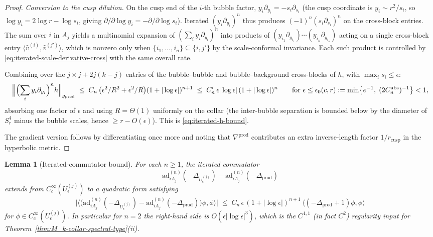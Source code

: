 \documentclass[11pt,letterpaper]{article}
\newtheorem{lemma}[theorem]{Lemma}
\theoremstyle{definition}
\newcommand{\Lap}{\Delta}
\begin{document}
\begin{proof}
\emph{Conversion to the cusp dilation.} On the cusp end of the $i$-th bubble factor, $y_i\partial_{y_i} = -s_i\partial_{s_i}$ (the cusp coordinate is $y_i \sim r^2/s_i$, so $\log y_i = 2\log r - \log s_i$, giving $\partial/\partial\log y_i = -\partial/\partial\log s_i$). Iterated $(y_i\partial_{y_i})^n$ thus produces $(-1)^n (s_i\partial_{s_i})^n$ on the cross-block entries. The sum over $i$ in $A_j$ yields a multinomial expansion of $(\sum_i y_i\partial_{y_i})^n$ into products of $(y_{i_1}\partial_{y_{i_1}})\cdots(y_{i_n}\partial_{y_{i_n}})$ acting on a single cross-block entry $\langle\hat v^{(i)}, \hat v^{(j')}\rangle$, which is nonzero only when $\{i_1,\dots,i_n\}\subseteq\{i,j'\}$ by the scale-conformal invariance. Each such product is controlled by \eqref{eq:iterated-scale-derivative-cross} with the same overall rate.

Combining over the $j\times j + 2j(k-j)$ entries of the bubble--bubble and bubble--background cross-blocks of $h$, with $\max_i s_i \le \epsilon$:
\[
\Bigl\|\Bigl(\sum_i y_i\partial_{y_i}\Bigr)^n h\Bigr\|_{g_{\mathrm{prod}}} \;\le\; C_n\,\bigl(\epsilon^2/R^2 + \epsilon^2/R\bigr)(1+|\log\epsilon|)^{n+1} \;\le\; C'_n\,\epsilon|\log\epsilon|\,(1+|\log\epsilon|)^n
\qquad \text{for } \epsilon \le \epsilon_0(c, r) := \min\bigl\{e^{-1},\; (2 C_n^{\mathrm{abs}})^{-1}\bigr\} < 1,
\]
absorbing one factor of $\epsilon$ and using $R = \Theta(1)$ uniformly on the collar (the inter-bubble separation is bounded below by the diameter of $S^4_r$ minus the bubble scales, hence $\ge r - O(\epsilon)$). This is \eqref{eq:iterated-h-bound}.

The gradient version follows by differentiating once more and noting that $\nabla^{\mathrm{prod}}$ contributes an extra inverse-length factor $1/r_{\mathrm{cusp}}$ in the hyperbolic metric.
\end{proof}

\begin{lemma}[Iterated-commutator bound]\label{app:lem:iterated}
For each $n \ge 1$, the iterated commutator
\[
\mathrm{ad}_{iA_j}^{(n)}(-\Lap_{U_\epsilon^{(j)}}) - \mathrm{ad}_{iA_j}^{(n)}(-\Lap_{\mathrm{prod}})
\]
extends from $C_c^\infty(U_\epsilon^{(j)})$ to a quadratic form satisfying
\begin{equation}\label{eq:iterated-commutator-bound}
\bigl|\bigl\langle\bigl(\mathrm{ad}_{iA_j}^{(n)}(-\Lap_{U_\epsilon^{(j)}}) - \mathrm{ad}_{iA_j}^{(n)}(-\Lap_{\mathrm{prod}})\bigr)\phi,\phi\bigr\rangle\bigr| \;\le\; C_n\,\epsilon\,(1+|\log\epsilon|)^{n+1}\,\langle(-\Lap_{\mathrm{prod}}+1)\phi,\phi\rangle
\end{equation}
for $\phi \in C_c^\infty(U_\epsilon^{(j)})$. In particular for $n=2$ the right-hand side is $O(\epsilon|\log\epsilon|^3)$, which is the $C^{1,1}$ (in fact $C^2$) regularity input for Theorem~\ref{thm:M_k-collar-spectral-type}(ii).
\end{lemma}
\end{document}
